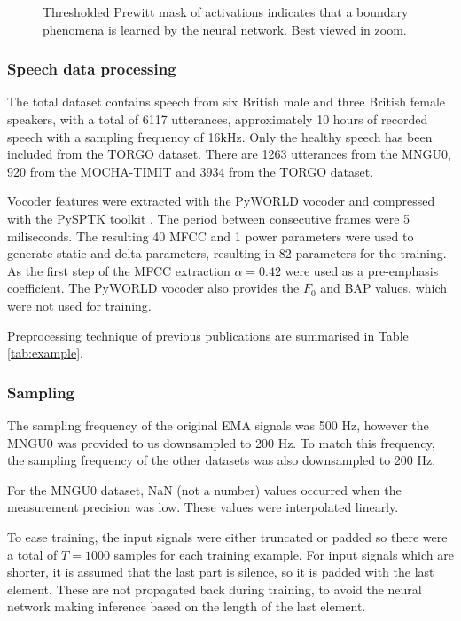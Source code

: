 \documentclass[a4paper]{article}
\begin{document}
\begin{figure}[t]
  \caption{Thresholded Prewitt mask of activations indicates that a boundary phenomena is learned by the neural network. Best viewed in zoom.}
  \label{fig:mask}
  \begin{center}
    \scalebox{0.40}{}
\end{center}
\end{figure}
\subsubsection{Speech data processing}


The total dataset contains speech from six British male and three British
female speakers, with a total of 6117 utterances, approximately 10 hours of recorded
speech with a sampling frequency of 16kHz.
Only the healthy speech has been included from the TORGO dataset. There are 1263 utterances from the
MNGU0, 920 from the MOCHA-TIMIT and 3934 from the TORGO dataset.

Vocoder features were extracted with the PyWORLD vocoder \cite{Morise2016}
and compressed with the PySPTK toolkit \cite{pysptk}. The period between consecutive
frames were 5 miliseconds. The resulting 40 MFCC and 1 power parameters
were used to generate static and delta parameters, resulting in 82
parameters for the training. As the first step of the MFCC extraction \( \alpha
= 0.42 \) were used as a pre-emphasis coefficient. The PyWORLD vocoder
also provides the $ F_0 $ and BAP values, which were not used for training.

Preprocessing technique of previous publications are summarised in Table \ref{tab:example}.
\subsubsection{Sampling}

The sampling frequency of the original EMA signals was 500 Hz, however
the MNGU0 was provided to us downsampled to 200 Hz. To match this frequency,
the sampling frequency of the other datasets was also downsampled to 200 Hz.

For the MNGU0 dataset, NaN (not a number) values occurred when the measurement precision
was low. These values were interpolated linearly. 

To ease training, the input signals were either truncated or padded
so there were a total of \( T = 1000 \) samples for each training example.
For input signals which are shorter, it is assumed that the last part is
silence, so it is padded with the last element. These are not propagated back during training, to avoid the neural network making inference based on the length of the last element.
\end{document}
